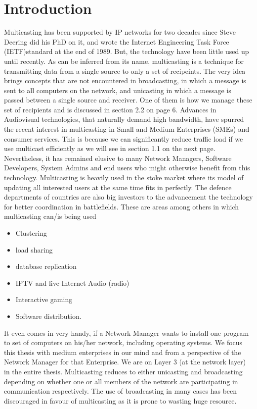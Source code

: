 \documentclass[11pt,left=2cm,bottom=2cm,oneside]{book}
\begin{document}
\chapter{Introduction}
Multicasting has been supported by IP networks for two decades since Steve
Deering did his PhD on it, and wrote the Internet Engineering Task Force (IETF)standard
at the end of 1989\cite{Deering}. But, the technology have been little used up until recently.
As can be inferred from its name, multicasting is a technique for transmitting data
from a single source to only a set of recipeints. The very idea brings concepts that
are not encountered in broadcasting, in which a message is sent to all computers on
the network, and unicasting in which a message is passed between a single source
and receiver. One of them is how we manage these set of recipients and is discussed
in section 2.2 on page 6.
Advances in Audiovisual technologies, that naturally demand high bandwidth,
have spurred the recent interest in multicasting in Small and Medium Enterprises
(SMEs) and consumer services. This is because we can significantly reduce traffic
load if we use multicast efficiently as we will see in section 1.1 on the next page. Nevertheless, it has remained elusive to many Network Managers, Software Developers,
System Admins and end users who might otherwise benefit from this technology.
Multicasting is heavily used in the stoke market where its model of updating all
interested users at the same time fits in perfectly. The defence departments of
countries are also big investors to the advancement the technology for better coordination in battlefields. These are areas among others in which multicasting can/is
being used
\begin{itemize}
\item Clustering
\item load sharing
\item database replication
\item IPTV and live Internet Audio (radio)
\item Interactive gaming
\item Software distribution.
\end{itemize}
It even comes in very handy, if a Network Manager wants to install one program
to set of computers on his/her network, including operating systems.
We focus this thesis with medium enterprises in our mind and from a perspective of the Network Manager for that Enterprise. We are on Layer 3 (at the network
layer) in the entire thesis.
Multicasting reduces to either unicasting and broadcasting depending on whether
one or all members of the network are participating in communication respectively.
The use of broadcasting in many cases has been discouraged in favour of multicasting as it is prone to wasting huge resource.
\end{document}
